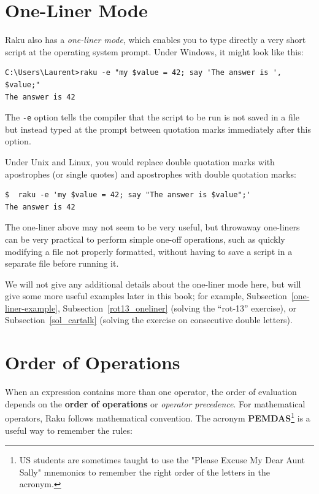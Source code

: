 \section{One-Liner Mode}

Raku also has a \emph{one-liner mode}, which enables you 
to type directly a very short script at the operating 
system prompt. Under Windows, it might look like this:
\label{one-liner mode}

\begin{verbatim}
C:\Users\Laurent>raku -e "my $value = 42; say 'The answer is ', $value;"
The answer is 42

\end{verbatim}

The {\tt -e} option tells the compiler that the script to 
be run is not saved in a file but instead typed at the 
prompt between quotation marks immediately after 
this option.

Under Unix and Linux, you would replace double quotation 
marks with apostrophes (or single quotes) 
and apostrophes with double quotation marks:

\begin{verbatim}
$  raku -e 'my $value = 42; say "The answer is $value";'
The answer is 42

\end{verbatim}

The one-liner above may not seem to be very useful, but 
throwaway one-liners can be very practical to perform 
simple one-off operations, such as quickly modifying 
a file not properly formatted, without having to save a script 
in a separate file before running it.

We will not give any additional details about the one-liner 
mode here, but will give some more useful examples 
later in this book; for example, 
Subsection~\ref{one-liner-example},
Subsection~\ref{rot13_oneliner} (solving the ``rot-13'' exercise), or
Subsection~\ref{sol_cartalk} (solving the exercise on 
consecutive double letters). 



\section{Order of Operations}

When an expression contains more than one operator, the order of
evaluation depends on the {\bf order of operations} or \emph{operator precedence}. 
For mathematical operators, Raku follows mathematical convention.
The acronym {\bf PEMDAS}\footnote{US students are sometimes taught 
to use the "Please Excuse My Dear Aunt Sally" mnemonics to remember 
the right order of the letters in the acronym.} is a useful 
way to remember the rules:

